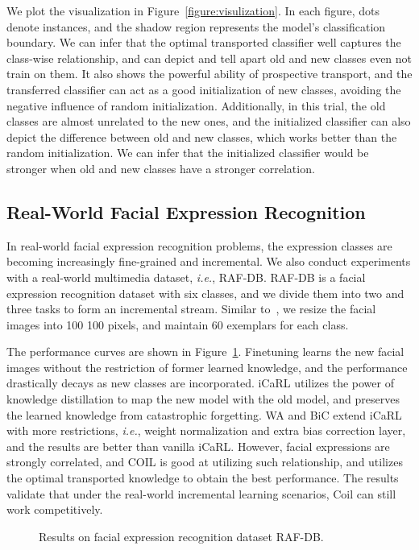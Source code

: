 \documentclass[sigconf]{acmart}
\newcommand{\ie}{\emph{i.e.}}
\newcommand{\name}{{\sc Coil }}
\begin{document}
We plot the visualization in Figure~\ref{figure:visulization}. 
In each figure, dots denote instances, and the shadow region represents the model's classification boundary. 
We can infer that the optimal transported classifier well captures the class-wise relationship, and can depict and tell apart old and new classes even not train on them. It also shows the powerful ability of prospective transport, and the transferred classifier can act as a good initialization of new classes, avoiding the negative influence of random initialization. Additionally, in this trial, the old classes are almost unrelated to the new ones, and the initialized classifier can also depict the difference between old and new classes, which works better than the random initialization. We can infer that the initialized classifier would be stronger when old and new classes have a stronger correlation.

\subsection{Real-World Facial Expression Recognition}

In real-world facial expression recognition problems, the expression classes are becoming increasingly fine-grained and incremental.
We also conduct experiments with a real-world multimedia dataset, \ie, RAF-DB. RAF-DB is a facial expression recognition dataset with six classes, and we divide them into two and three tasks to form an incremental stream. Similar to~\cite{zhu2020iexpressnet}, we resize the facial images into 100  100 pixels, and maintain 60 exemplars for each class.

The performance curves are shown in Figure~\ref{figure:rafdbresults}.
Finetuning learns the new facial images without the restriction of former learned knowledge, and the performance drastically decays as new classes are incorporated. iCaRL utilizes the power of knowledge distillation to map the new model with the old model, and preserves the learned knowledge from catastrophic forgetting. WA and BiC extend iCaRL with more restrictions, \ie, weight normalization and extra bias correction layer, and the results are better than vanilla iCaRL. 
However, facial expressions are strongly correlated, and COIL is good at utilizing such relationship, and utilizes the optimal transported knowledge to obtain the best performance. The results validate that under the real-world incremental learning scenarios, \name can still work competitively.


\begin{figure}[t]
	\begin{center}
	\end{center}
	\vspace{-3mm}
	\caption{\small Results on facial expression recognition dataset RAF-DB.  } \label{figure:rafdbresults}
	\vspace{-3mm}
\end{figure}
\end{document}
